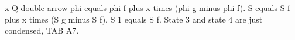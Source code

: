 x Q double arrow phi equals phi f plus x times (phi g minus phi f).  
S equals S f plus x times (S g minus S f).  
S 1 equals S f.  
State 3 and state 4 are just condensed,  
TAB A7.